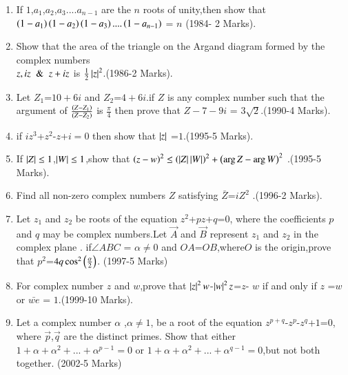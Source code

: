 \documentclass[journal]{IEEEtran}
\begin{document}
\begin{enumerate}[start=7] %
\item If $1$,$a_1$,$a_2$,$a_3$....$a_{n-1}$ are the $n$  roots of unity,then show that $\left(1-a_1\right)\left(1-a_2\right)\left(1-a_3\right)....\left(1-a_{n-1}\right)$ = $n$ \hfill (1984- 2 Marks).\\
\item Show that the area of the triangle on the Argand diagram formed by the complex numbers\\
$z,iz \And z+iz$ is $\frac{1}{2}\left\vert z\right\vert^2$.\hfill (1986-2 Marks).\\
\item Let $Z_1$=$10+6i$ and $Z_2$=$4+6i$.if $Z$ is any complex number such that the argument of ${\frac{\left(Z-Z_1\right)}{\left(Z-Z_2\right)}}$ is ${\frac{\pi}{4}}$ then prove that $Z-7-9i$ = $3\sqrt{2}$.\hfill(1990-4 Marks).\\
\item if {$iz^{3}$+$z^2$-$z$+$i=0$} then show that $\left\vert z\right\vert$ =$1$.\hfill(1995-5 Marks).\\
\item If $\left\vert Z\right\vert\le1$,$\left\vert W\right\vert\le1$,show that $\left(z-w\right)^2\le\left(\left\vert Z\right\vert\left\vert W\right\vert\right)^2+\left(\arg Z-\arg W\right)^2$ .\hfill(1995-5 Marks). \\
\item Find all non-zero complex numbers $Z$ satisfying $\bar Z$=$ iZ^2 $ .\hfill(1996-2 Marks).\\
\item Let $z_1$ and $z_2$ be roots of the equation $z^2$+$pz$+$q$=$0$, where the coefficients $p$ and $q$ may be complex numbers.Let $\Vec{A}$ and $\Vec{B}$ represent $z_1$ and $z_2$ in the complex plane . if$\angle ABC$ = $\alpha \not=0$ and $OA$=$OB$,where$O$ is the origin,prove that $p^2$=$4q\cos^2\left(\frac{\alpha}{2}\right)$. \hfill(1997-5 Marks)\\
\item For complex number $z$ and $w$,prove that $\left\vert z\right\vert^2w$-$\left\vert w\right\vert^2z$=$z$- $w$ if and only if $z$ =$w$ or $\bar{we} $ = $1$.\hfill(1999-10 Marks).\\
\item Let a complex number $\alpha$ ,$\alpha \not=1$, be a root of the equation $z^{p+q}$-$z^p$-$z^q$+$1$=$0$, where $\Vec{p}$,$\Vec{q}$ are the distinct primes. Show that either $1+\alpha+\alpha^2+...+\alpha^{p-1}=0$ or $1+\alpha+\alpha^2+...+\alpha^{q- 1}=0$,but not both together. \hfill(2002-5 Marks)\\

\end{enumerate}
\end{document}
